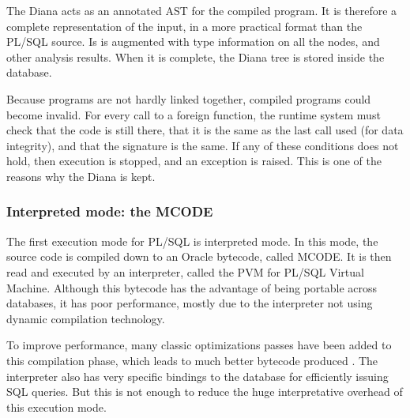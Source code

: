 \documentclass[twoside,11pt,a4paper]{article}
\begin{document}
The Diana acts as an annotated AST for the compiled program. It is therefore a complete representation of the input, in a more practical format than the PL/SQL source. Is is augmented with type information on all the nodes, and other analysis results. When it is complete, the Diana tree is stored inside the database.



Because programs are not hardly linked together, compiled programs could become invalid. For every call to a foreign function, the runtime system must check that the code is still there, that it is the same as the last call used (for data integrity), and that the signature is the same. If any of these conditions does not hold, then execution is stopped, and an exception is raised. This is one of the reasons why the Diana is kept.

\subsubsection{Interpreted mode: the MCODE}

The first execution mode for PL/SQL is interpreted mode. In this mode, the source code is compiled down to an Oracle bytecode, called MCODE. It is then read and executed by an interpreter, called the PVM for PL/SQL Virtual Machine. Although this bytecode has the advantage of being portable across databases, it has poor performance, mostly due to the interpreter not using dynamic compilation technology.

To improve performance, many classic optimizations passes have been added to this compilation phase, which leads to much better bytecode produced \cite{freedomplsopt}. The interpreter also has very specific bindings to the database for efficiently issuing SQL queries. But this is not enough to reduce the huge interpretative overhead of this execution mode.
\end{document}

